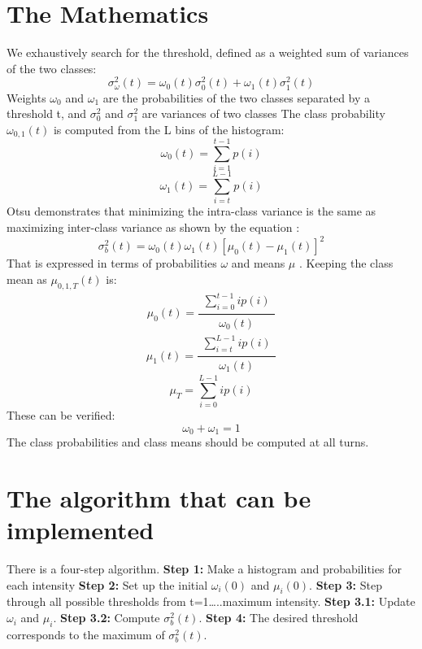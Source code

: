 \documentclass[BTech]{srmuthesis}
\begin{document}
\section{The Mathematics}
We exhaustively search for the threshold, defined as a weighted sum of variances of the two classes:
\begin{equation}
\sigma^{2}_{\omega}(t) = \omega_{0}(t) \sigma^{2}_{0}(t) + \omega_{1}(t) \sigma^{2}_{1}(t) 
\end{equation}
Weights $\omega_{0}$   and  $\omega_{1}$ are the probabilities of the two classes separated by a threshold t, and  $\sigma^{2}_{0}$ and $\sigma^{2}_{1}$ are variances of two classes The class probability $\omega_{0,1}(t) $ is computed from the L bins of the histogram:
\begin{equation}
\omega_{0}(t) = \sum_{i=1}^{t-1} p(i)
\end{equation}
\begin{equation}
\omega_{1}(t) = \sum_{i=t}^{L-1} p(i)
\end{equation}
Otsu demonstrates that minimizing the intra-class variance is the same as maximizing inter-class variance as shown by the equation :
\begin{equation}
\sigma^{2}_{b}(t) = \omega_{0}(t) \omega_{1}(t) [\mu_{0}(t)-\mu_{1}(t)]^{2}
\end{equation}
That is expressed in terms of probabilities $\omega$ and means $\mu $ . Keeping the class mean as  $\mu_{0,1,T}(t)$ is:
\begin{equation}
\mu_{0}(t) = \frac  {\substack{\sum_{i=0}^{t-1} ip(i)}}
{\substack{\omega_{0}(t)}  }
\end{equation}
\begin{equation}
\mu_{1}(t) = \frac  {\substack{\sum_{i=t}^{L-1} ip(i)}}
{\substack{\omega_{1}(t)}  }
\end{equation}
\begin{equation}
\mu_{T} = \sum_{i=0}^{L-1} ip(i)
\end{equation}
These can be verified:
\begin{equation}
	\omega_{0} + \omega_{1} = 1
\end{equation}
The class probabilities and class 
means should be computed at all turns.

\section{The algorithm that can be implemented}
There is a four-step algorithm.
\newline
\textbf{Step 1:} Make a histogram and probabilities for each intensity
\newline
\textbf{Step 2:} Set up the initial $\omega_{i}(0)$ and $\mu_{i}(0)$.
\newline
\textbf{Step 3:} Step through all possible thresholds from t=1…..maximum intensity.
\newline
\textbf{Step 3.1:} Update $\omega_{i}$ and $\mu_{i}$.
\newline
\textbf{Step 3.2:} Compute $\sigma^{2}_{b}(t)$.
\newline
\textbf{Step 4:} The desired threshold corresponds to the maximum of $\sigma^{2}_{b}(t)$.
\end{document}
